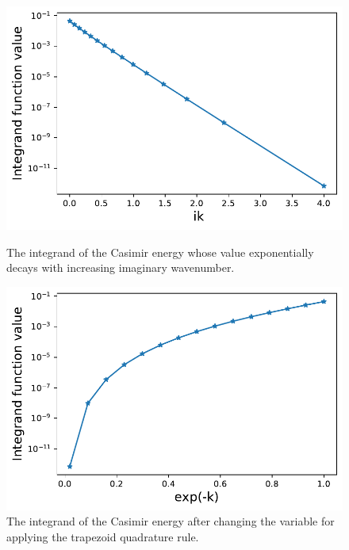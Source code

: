 \begin{figure}[H]
    \begin{minipage}[b]{.47\textwidth}
    \centering
    \includegraphics[scale = 0.5]{figures/integ_exp_decay.pdf}
    \caption{The integrand of the Casimir energy whose value exponentially decays with increasing imaginary  wavenumber.}
    \label{The integrand decays exponentially}
    \end{minipage}
    \hfill
    \begin{minipage}[b]{.47\textwidth}
    \centering
    \includegraphics[scale = 0.5]{figures/integ_exp_not_decay.pdf}
    \caption{The integrand of the Casimir energy after changing the variable for applying the trapezoid quadrature rule.}
    \label{The integrand does not decay exponentially}
    \end{minipage}
    \end{figure}
